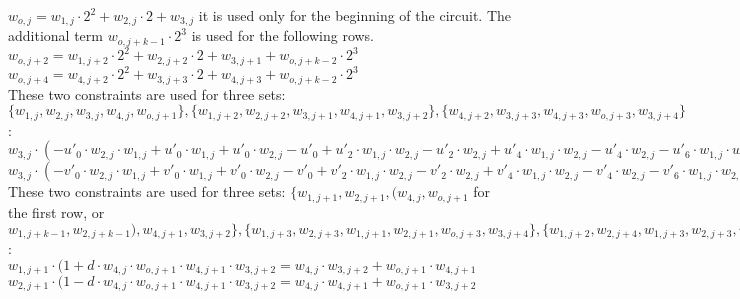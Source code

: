 \begin{center}
$w_{o, j } = w_{1,j} \cdot 2^2 + w_{2,j} \cdot 2 + w_{3, j}$ it is used only for the beginning of the circuit. The additional term $w_{o, j+k - 1} \cdot 2^3$ is used for the following rows. \\
$w_{o, j + 2} = w_{1,j + 2} \cdot 2^2 + w_{2,j + 2} \cdot 2 + w_{3, j + 1} + w_{o, j+k - 2} \cdot 2^3$ \\
$w_{o, j + 4} = w_{4,j + 2} \cdot 2^2 + w_{3,j + 3} \cdot 2 + w_{4, j + 3} + w_{o, j+k - 2} \cdot 2^3$ \\


These two constraints are used for three sets: $\{ w_{1,j}, w_{2,j}, w_{3,j}, w_{4,j}, w_{o, j+1} \}, \{ w_{1, j+2}, w_{2, j +2}, w_{3, j+1}, w_{4, j+1}, w_{3, j+2}\}, \{w_{4,j+2}, w_{3,j+3}, w_{4, j+3},w_{o, j+3}, w_{3, j+4} \}$: \\
$w_{3, j} \cdot (-u'_0 \cdot w_{2, j} \cdot w_{1, j} + u'_0 \cdot w_{1, j} + u'_0 \cdot w_{2, j} - u'_0 + u'_2 \cdot w_{1, j}\cdot w_{2, j} - u'_2\cdot w_{2, j} + u'_4 \cdot w_{1, j}\cdot w_{2, j} - u'_4\cdot w_{2, j} -u'_6 \cdot w_{1, j} \cdot w_{2, j} + u'_1 \cdot w_{2, j} \cdot w_{1, j} - u'_1 \cdot w_{1, j} - u'_1 \cdot w_{2, j} + u'_1  - u'_3 \cdot w_{1, j}\cdot w_{2, j} + u'_3\cdot w_{2, j} - u'_5 \cdot w_{1, j}\cdot w_{2, j} + u'_5\cdot w_{2, j} + u'_7 \cdot w_{1, j} \cdot w_{2, j}) = w_{4,j} -u'_0 \cdot w_{2, j} \cdot w_{1, j} + u'_0 \cdot w_{1, j} + u'_0 \cdot w_{2, j} - u'_0 + u'_2 \cdot w_{1, j}\cdot w_{2, j} - u'_2\cdot w_{2, j} + u'_4 \cdot w_{1, j}\cdot w_{2, j} - u'_4\cdot w_{2, j} -u'_6 \cdot w_{1, j} \cdot w_{2, j} $ \\

$w_{3, j} \cdot (-v'_0 \cdot w_{2, j} \cdot w_{1, j} + v'_0 \cdot w_{1, j} + v'_0 \cdot w_{2, j} - v'_0 + v'_2 \cdot w_{1, j}\cdot w_{2, j} -v'_2\cdot w_{2, j} + v'_4 \cdot w_{1, j}\cdot w_{2, j} - v'_4\cdot w_{2, j} -v'_6 \cdot w_{1, j} \cdot w_{2, j} + v'_1 \cdot w_{2, j} \cdot w_{1, j} - v'_1 \cdot w_{1, j} - v'_1 \cdot w_{2, j} + v'_1  - v'_3 \cdot w_{1, j}\cdot w_{2, j} + v'_3\cdot w_{2, j} - v'_5 \cdot w_{1, j}\cdot w_{2, j} + v'_5\cdot w_{2, j} + v'_7 \cdot w_{1, j} \cdot w_{2, j}) = w_{o,j+1} - v'_0 \cdot w_{2, j} \cdot w_{1, j} + v'_0 \cdot w_{1, j} + v'_0 \cdot w_{2, j} - v'_0 + v'_2 \cdot w_{1, j}\cdot w_{2, j} - v'_2\cdot w_{2, j} + v'_4 \cdot w_{1, j}\cdot w_{2, j} - v'_4\cdot w_{2, j} - v'_6 \cdot w_{1, j} \cdot w_{2, j} $ \\

These two constraints are used for three sets: $\{ w_{1,j+1}, w_{2,j+1}, ( w_{4,j}, w_{o,j+1}$  for the first row, or $w_{1, j + k - 1}, w_{2, j + k - 1}), w_{4, j+1}, w_{3,j+2} \}, \{ w_{1, j+3}, w_{2, j +3}, w_{1, j+1}, w_{2, j+1}, w_{o, j+3}, w_{3, j+4}\}, \{w_{1,j+2}, w_{2,j+4}, w_{1, j+3},w_{2, j+3}, w_{4, j+5}, w_{o,j+6} \}$: \\
$w_{1, j+1} \cdot (1 + d \cdot w_{4,j} \cdot w_{o,j+1} \cdot w_{4,j+1} \cdot w_{3, j+2} = w_{4,j} \cdot w_{3, j+2} + w_{o,j+1} \cdot w_{4,j+1}$
$w_{2, j+1} \cdot (1 - d \cdot w_{4,j} \cdot w_{o,j+1} \cdot w_{4,j+1} \cdot w_{3, j+2} = w_{4,j} \cdot w_{4, j+1} + w_{o,j+1} \cdot w_{3,j+2}$

\end{center}

